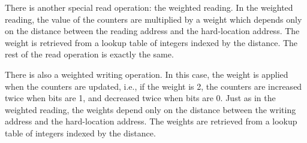 There is another special read operation: the weighted reading. In the weighted reading, the value of the counters are multiplied by a weight which depends only on the distance between the reading address and the hard-location address. The weight is retrieved from a lookup table of integers indexed by the distance. The rest of the read operation is exactly the same.

There is also a weighted writing operation. In this case, the weight is applied when the counters are updated, i.e., if the weight is 2, the counters are increased twice when bits are 1, and decreased twice when bits are 0. Just as in the weighted reading, the weights depend only on the distance between the writing address and the hard-location address. The weights are retrieved from a lookup table of integers indexed by the distance.
